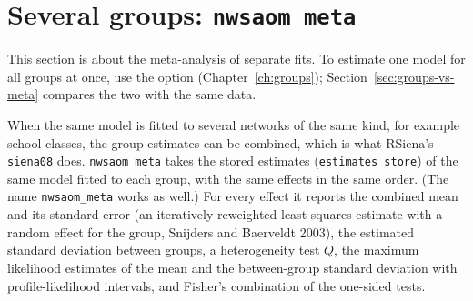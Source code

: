 \section{Several groups: \texttt{nwsaom meta}}\label{sec:meta}

This section is about the meta-analysis of separate fits. To estimate one model for all groups at once, use the option  (Chapter~\ref{ch:groups}); Section~\ref{sec:groups-vs-meta} compares the two with the same data.

When the same model is fitted to several networks of the same kind, for example school classes, the group estimates can be combined, which is what RSiena's \texttt{siena08} does. \texttt{nwsaom meta} takes the stored estimates (\texttt{estimates store}) of the same model fitted to each group, with the same effects in the same order. (The name \texttt{nwsaom\_meta} works as well.) For every effect it reports the combined mean and its standard error (an iteratively reweighted least squares estimate with a random effect for the group, Snijders and Baerveldt 2003), the estimated standard deviation between groups, a heterogeneity test $Q$, the maximum likelihood estimates of the mean and the between-group standard deviation with profile-likelihood intervals, and Fisher's combination of the one-sided tests.

